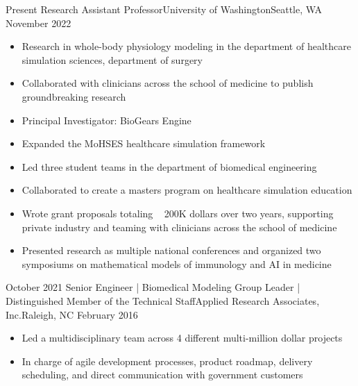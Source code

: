 %
%
%

\begin{experiences}
  \experience
    {Present}   {Research Assistant Professor}{University of Washington}{Seattle, WA}
    {November 2022} {
                      \begin{itemize}
                        \item Research in whole-body physiology modeling in the department of healthcare simulation sciences, department of surgery
                        \item Collaborated with clinicians across the school of medicine to publish groundbreaking research
                        \item Principal Investigator: BioGears Engine
                        \item Expanded the MoHSES healthcare simulation framework
                        \item Led three student teams in the department of biomedical engineering
                        \item Collaborated to create a masters program on healthcare simulation education
                        \item Wrote grant proposals totaling ~ 200K dollars over two years, supporting private industry and teaming with clinicians across the school of medicine
                        \item Presented research as multiple national conferences and organized two symposiums on mathematical models of immunology and AI in medicine  
                      \end{itemize}
                    }
                    {}
  \emptySeparator
  \experience
    {October 2021} {Senior Engineer | Biomedical Modeling Group Leader | Distinguished Member of the Technical Staff}{Applied Research Associates, Inc.}{Raleigh, NC}
    {February 2016}    {
                      \begin{itemize}
                        \item Led a multidisciplinary team across 4 different multi-million dollar projects                           
                        \item In charge of agile development processes, product roadmap, delivery scheduling, and direct communication with government customers                        

\end{itemize}}
\end{experiences}

